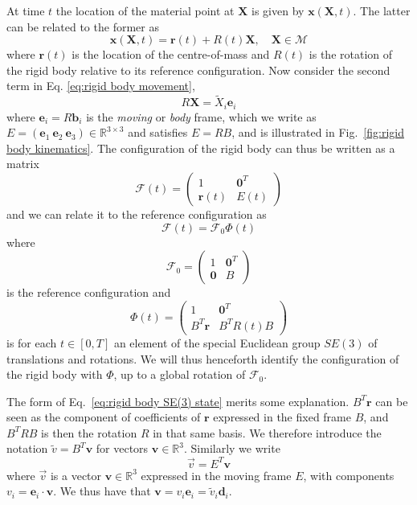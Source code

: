 At time $t$ the location of the material point at $\mathbf{X}$ is given by $\mathbf{x}(\mathbf{X}, t)$. The latter can be related to the former as
\begin{equation} \label{eq:rigid body movement}
\mathbf{x}(\mathbf{X}, t) = \mathbf{r}(t) + R(t) \mathbf{X}, \quad  \mathbf{X} \in \mathscr{M}
\end{equation}
where $\mathbf{r}(t)$ is the location of the centre-of-mass and $R(t)$ is the rotation of the rigid body relative to its reference configuration. Now consider the second term in Eq. \ref{eq:rigid body movement},
\begin{equation}
R \mathbf{X} = \tilde{X}_i \mathbf{e}_i
\end{equation}
where $\mathbf{e}_i = R \mathbf{b}_i$ is the \textit{moving} or \textit{body} frame, which we write as $E = (\mathbf{e}_1\ \mathbf{e}_2\ \mathbf{e}_3) \in \mathbb{R}^{3 \times 3}$ and satisfies $E = RB$, and is illustrated in Fig.~\ref{fig:rigid body kinematics}. The configuration of the rigid body can thus be written as a matrix
\begin{equation}
\mathcal{F}(t) = \begin{pmatrix}
1 & \mathbf{0}^T \\
\mathbf{r}(t) & E(t)
\end{pmatrix}
\end{equation}
and we can relate it to the reference configuration as
\begin{equation}
\mathcal{F}(t) = \mathcal{F}_0  \Phi(t)
\end{equation}
where
\begin{equation}
\mathcal{F}_0 = \begin{pmatrix}
1 & \mathbf{0}^T \\
\mathbf{0} & B
\end{pmatrix}
\end{equation}
is the reference configuration and
\begin{equation} \label{eq:rigid body SE(3) state}
\Phi(t) = \begin{pmatrix}
1 & \mathbf{0}^T \\
B^T \mathbf{r} & B^T R(t) B
\end{pmatrix}
\end{equation}
is for each $t \in [0, T]$ an element of the special Euclidean group $SE(3)$ of translations and rotations. We will thus henceforth identify the configuration of the rigid body with $\Phi$, up to a global rotation of $\mathcal{F}_0$. 

The form of Eq.~\ref{eq:rigid body SE(3) state} merits some explanation. $B^T \mathbf{r}$ can be seen as the component of coefficients of $\mathbf{r}$ expressed in the fixed frame $B$, and $B^T R B$ is then the rotation $R$ in that same basis. We therefore introduce the notation $\tilde{v} = B^T \mathbf{v}$ for vectors $\mathbf{v} \in \mathbb{R}^3$. Similarly we write
\begin{equation}
\vec{v} = E^T \mathbf{v}
\end{equation}
where $\vec{v}$ is a vector $\mathbf{v} \in \mathbb{R}^3$ expressed in the moving frame $E$, with components $v_i = \mathbf{e}_i \cdot \mathbf{v}$. We thus have that $\mathbf{v} = v_i \mathbf{e}_i = \tilde{v}_i \mathbf{d}_i$.

